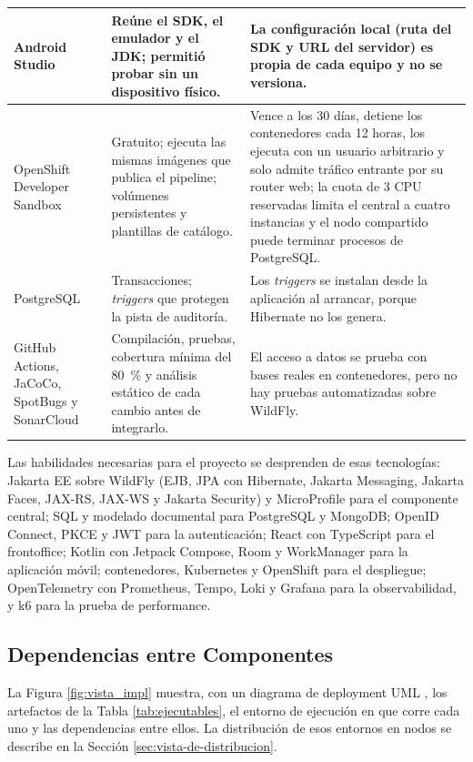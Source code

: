 {\begin{longtable}{|p{3.4cm}|p{6cm}|p{6.2cm}|}
    \hline
    Android Studio & Reúne el SDK, el emulador y el JDK; permitió probar sin un dispositivo físico. & La configuración local (ruta del SDK y URL del servidor) es propia de cada equipo y no se versiona. \\
    \hline
    OpenShift Developer Sandbox & Gratuito; ejecuta las mismas imágenes que publica el pipeline; volúmenes persistentes y plantillas de catálogo. & Vence a los 30 días, detiene los contenedores cada 12 horas, los ejecuta con un usuario arbitrario y solo admite tráfico entrante por su router web; la cuota de 3 CPU reservadas limita el central a cuatro instancias y el nodo compartido puede terminar procesos de PostgreSQL. \\
    \hline
    PostgreSQL & Transacciones; \textit{triggers} que protegen la pista de auditoría. & Los \textit{triggers} se instalan desde la aplicación al arrancar, porque Hibernate no los genera. \\
    \hline
    GitHub Actions, JaCoCo, SpotBugs y SonarCloud & Compilación, pruebas, cobertura mínima del 80~\% y análisis estático de cada cambio antes de integrarlo. & El acceso a datos se prueba con bases reales en contenedores, pero no hay pruebas automatizadas sobre WildFly. \\
    \hline
\end{longtable}}

Las habilidades necesarias para el proyecto se desprenden de esas tecnologías: Jakarta EE sobre WildFly (EJB, JPA con Hibernate, Jakarta Messaging, Jakarta Faces, JAX-RS, JAX-WS y Jakarta Security) y MicroProfile para el componente central; SQL y modelado documental para PostgreSQL y MongoDB; OpenID Connect, PKCE y JWT para la autenticación; React con TypeScript para el frontoffice; Kotlin con Jetpack Compose, Room y WorkManager para la aplicación móvil; contenedores, Kubernetes y OpenShift para el despliegue; OpenTelemetry con Prometheus, Tempo, Loki y Grafana para la observabilidad, y k6 para la prueba de performance.

\subsection{Dependencias entre Componentes}

La Figura \ref{fig:vista_impl} muestra, con un diagrama de deployment UML \cite{Ambysoft2018}, los artefactos de la Tabla \ref{tab:ejecutables}, el entorno de ejecución en que corre cada uno y las dependencias entre ellos. La distribución de esos entornos en nodos se describe en la Sección \ref{sec:vista-de-distribucion}.

